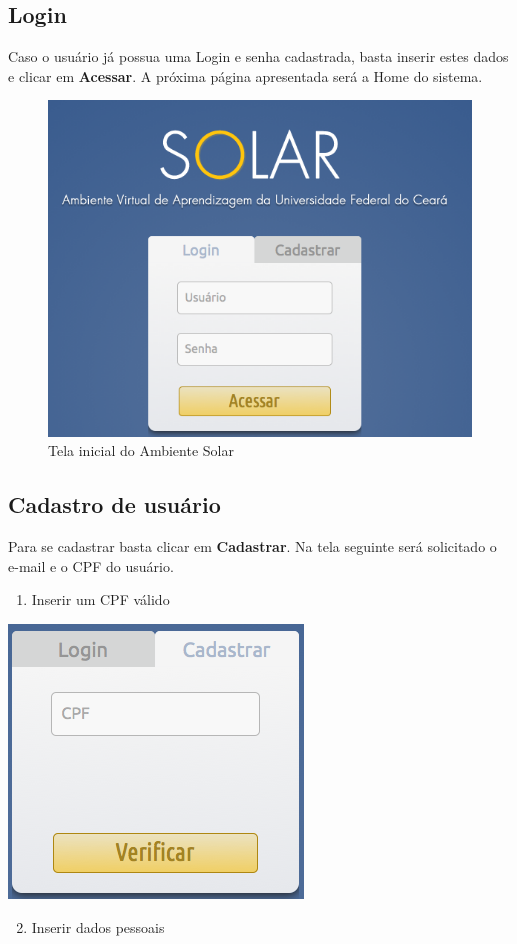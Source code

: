 \documentclass[letterpaper,10pt,english]{sphinxmanual}
\begin{document}
\subsection{Login}
\label{access:login}\label{access:id1}
Caso o usuário já possua uma Login e senha cadastrada, basta inserir estes dados e clicar em \textbf{Acessar}. A próxima página apresentada será a Home do sistema.
\begin{figure}[htbp]
\centering
\capstart

\includegraphics{login-01.png}
\caption{Tela inicial do Ambiente Solar}\end{figure}


\subsection{Cadastro de usuário}
\label{access:cadastro}\label{access:cadastro-de-usuario}
Para se cadastrar basta clicar em \textbf{Cadastrar}. Na tela seguinte será solicitado o e-mail e o CPF do usuário.
\begin{enumerate}
\item {} 
Inserir um CPF válido

\end{enumerate}

{\includegraphics{register-01.png}\hfill}
\begin{enumerate}
\setcounter{enumi}{1}
\item {} 
Inserir dados pessoais

\end{enumerate}
\end{document}
